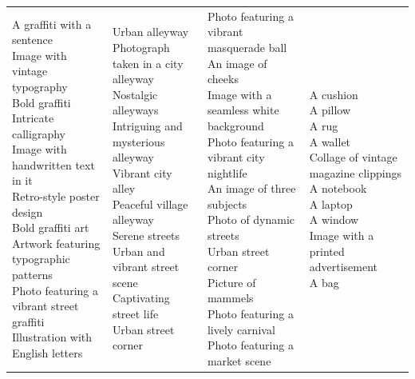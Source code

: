 \documentclass{article}
\begin{document}
\begin{table}[htbp]
\begin{tabular}{|p{4.0cm}|p{4.0cm}|p{4.0cm}|p{4.0cm}|}
\makecell[t]{A graffiti with a sentence \\ Image with vintage typography \\ Bold graffiti \\ Intricate calligraphy \\ Image with handwritten text in it \\ Retro-style poster design \\ Bold graffiti art \\ Artwork featuring typographic patterns \\ Photo featuring a vibrant street graffiti \\ Illustration with English letters} & \makecell[t]{Urban alleyway \\ Photograph taken in a city alleyway \\ Nostalgic alleyways \\ Intriguing and mysterious alleyway \\ Vibrant city alley \\ Peaceful village alleyway \\ Serene streets \\ Urban and vibrant street scene \\ Captivating street life \\ Urban street corner} & \makecell[t]{Photo featuring a vibrant masquerade ball \\ An image of cheeks \\ Image with a seamless white background \\ Photo featuring a vibrant city nightlife \\ An image of three subjects \\ Photo of dynamic streets \\ Urban street corner \\ Picture of mammels \\ Photo featuring a lively carnival \\ Photo featuring a market scene} & \makecell[t]{A cushion \\ A pillow \\ A rug \\ A wallet \\ Collage of vintage magazine clippings \\ A notebook \\ A laptop \\ A window \\ Image with a printed advertisement \\ A bag} \\

\end{tabular}
\end{table}
\end{document}
